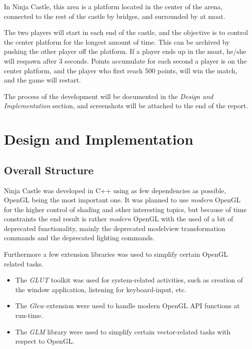 \documentclass[12pt,a4paper,titlepage]{article}
\begin{document}
In Ninja Castle, this area is a platform located in the center of the arena,
connected to the rest of the castle by bridges, and surrounded by at moat.

The two players will start in each end of the castle, and the objective is to
control the center platform for the longest amount of time. This can be
archived by pushing the other player off the platform. If a player ends up in
the moat, he/she will respawn after 3 seconds. Points accumulate for each
second a player is on the center platform, and the player who first reach 500
points, will win the match, and the game will restart.

The process of the development will be documented in the \emph{Design and
Implementation} section, and screenshots will be attached to the end of the
report.

\section{Design and Implementation}
\label{sec-2}
\subsection*{Overall Structure}
\label{sec-2-1}
Ninja Castle was developed in C++ using as few dependencies as possible,
OpenGL being the most important one. It was planned to use \emph{modern} OpenGL
for the higher control of shading and other interesting topics, but because
of time constraints the end result is rather \emph{modern} OpenGL with the used of 
a bit of deprecated functionality, mainly the deprecated modelview
transformation commands and the deprecated lighting commands.


Furthermore a few extension libraries was used to simplify certain OpenGL
related tasks.

\begin{itemize}
\item The \emph{GLUT} toolkit was used for system-related activities, such as creation
of the window application, listening for keyboard-input, etc.
\item The \emph{Glew} extension were used to handle modern OpenGL API functions at run-time.
\item The \emph{GLM} library were used to simplify certain vector-related tasks with
respect to OpenGL.
\end{itemize}
\end{document}
